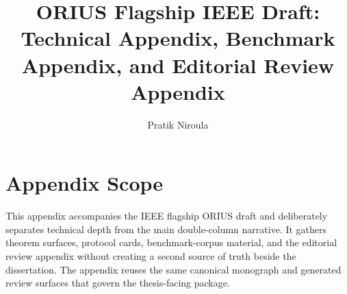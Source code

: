 \documentclass[10pt,journal,onecolumn]{IEEEtran}
\title{ORIUS Flagship IEEE Draft: Technical Appendix, Benchmark Appendix, and Editorial Review Appendix}
\author{Pratik Niroula}
\date{}
\begin{document}
\maketitle
\tableofcontents

\section{Appendix Scope}
This appendix accompanies the IEEE flagship ORIUS draft and deliberately separates
technical depth from the main double-column narrative. It gathers theorem surfaces,
protocol cards, benchmark-corpus material, and the editorial review appendix without
creating a second source of truth beside the dissertation. The appendix reuses the same
canonical monograph and generated review surfaces that govern the thesis-facing package.







\nocite{*}


\end{document}
